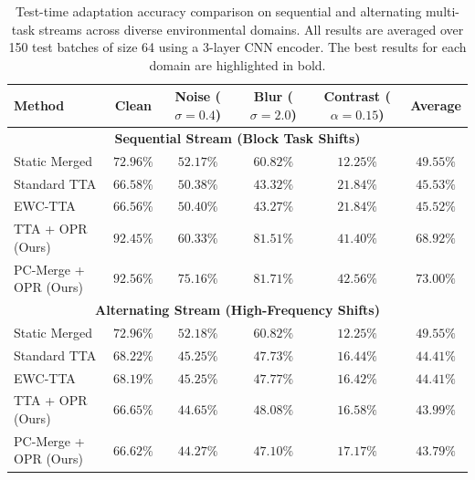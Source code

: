 \documentclass{article}
\theoremstyle{plain}
\theoremstyle{definition}
\theoremstyle{remark}
\begin{document}
\begin{table}[t]
\caption{Test-time adaptation accuracy comparison on sequential and alternating multi-task streams across diverse environmental domains. All results are averaged over 150 test batches of size 64 using a 3-layer CNN encoder. The best results for each domain are highlighted in bold.}
\label{tab:results}
\vskip 0.15in
\begin{center}
\begin{small}
\begin{sc}
\begin{tabular}{lccccc}
\toprule
Method & Clean & Noise ($\sigma=0.4$) & Blur ($\sigma=2.0$) & Contrast ($\alpha=0.15$) & Average \\
\midrule
\multicolumn{6}{c}{\textbf{Sequential Stream (Block Task Shifts)}} \\
\midrule
Static Merged & $72.96\%$ & $52.17\%$ & $60.82\%$ & $12.25\%$ & $49.55\%$ \\
Standard TTA & $66.58\%$ & $50.38\%$ & $43.32\%$ & $21.84\%$ & $45.53\%$ \\
EWC-TTA & $66.56\%$ & $50.40\%$ & $43.27\%$ & $21.84\%$ & $45.52\%$ \\
TTA + OPR (Ours) & $92.45\%$ & $60.33\%$ & $81.51\%$ & $41.40\%$ & $68.92\%$ \\
PC-Merge + OPR (Ours) & $\mathbf{92.56\%}$ & $\mathbf{75.16\%}$ & $\mathbf{81.71\%}$ & $\mathbf{42.56\%}$ & $\mathbf{73.00\%}$ \\
\midrule
\multicolumn{6}{c}{\textbf{Alternating Stream (High-Frequency Shifts)}} \\
\midrule
Static Merged & $\mathbf{72.96\%}$ & $\mathbf{52.18\%}$ & $\mathbf{60.82\%}$ & $12.25\%$ & $\mathbf{49.55\%}$ \\
Standard TTA & $68.22\%$ & $45.25\%$ & $47.73\%$ & $16.44\%$ & $44.41\%$ \\
EWC-TTA & $68.19\%$ & $45.25\%$ & $47.77\%$ & $16.42\%$ & $44.41\%$ \\
TTA + OPR (Ours) & $66.65\%$ & $44.65\%$ & $48.08\%$ & $16.58\%$ & $43.99\%$ \\
PC-Merge + OPR (Ours) & $66.62\%$ & $44.27\%$ & $47.10\%$ & $\mathbf{17.17\%}$ & $43.79\%$ \\
\bottomrule
\end{tabular}
\end{sc}
\end{small}
\end{center}
\vskip -0.1in
\end{table}
\end{document}
